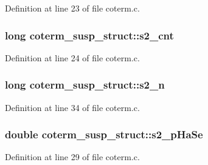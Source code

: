 Definition at line 23 of file coterm.\+c.

\subsubsection[{\texorpdfstring{s2\+\_\+cnt}{s2_cnt}}]{\setlength{\rightskip}{0pt plus 5cm}long coterm\+\_\+susp\+\_\+struct\+::s2\+\_\+cnt}\hypertarget{structcoterm__susp__struct_a9cc8880fffe8fa8b68ffc8558856292d}{}\label{structcoterm__susp__struct_a9cc8880fffe8fa8b68ffc8558856292d}


Definition at line 24 of file coterm.\+c.

\subsubsection[{\texorpdfstring{s2\+\_\+n}{s2_n}}]{\setlength{\rightskip}{0pt plus 5cm}long coterm\+\_\+susp\+\_\+struct\+::s2\+\_\+n}\hypertarget{structcoterm__susp__struct_ac37dbe3877f42b4e869444c455465a9a}{}\label{structcoterm__susp__struct_ac37dbe3877f42b4e869444c455465a9a}


Definition at line 34 of file coterm.\+c.

\subsubsection[{\texorpdfstring{s2\+\_\+p\+Ha\+Se}{s2_pHaSe}}]{\setlength{\rightskip}{0pt plus 5cm}double coterm\+\_\+susp\+\_\+struct\+::s2\+\_\+p\+Ha\+Se}\hypertarget{structcoterm__susp__struct_a2a6a09b264ba9911e4ffef5939906bf3}{}\label{structcoterm__susp__struct_a2a6a09b264ba9911e4ffef5939906bf3}


Definition at line 29 of file coterm.\+c.

